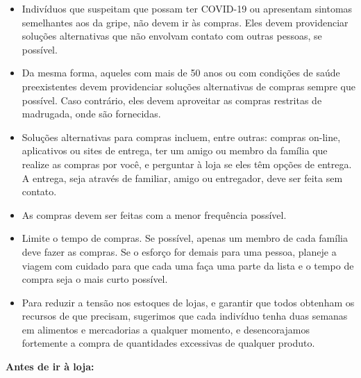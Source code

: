\documentclass[onecolumn,journal]{IEEEtran}
\begin{document}
\begin{multicols}{2}
\begin{itemize}
    \item Indivíduos que suspeitam que possam ter COVID-19 ou apresentam sintomas semelhantes aos da gripe, não devem ir às compras. Eles devem providenciar soluções alternativas que não envolvam contato com outras pessoas, se possível.
    \item Da mesma forma, aqueles com mais de 50 anos ou com condições de saúde preexistentes devem providenciar soluções alternativas de compras sempre que possível. Caso contrário, eles devem aproveitar as compras restritas de madrugada, onde são fornecidas.
    \item Soluções alternativas para compras incluem, entre outras: compras on-line, aplicativos ou sites de entrega, ter um amigo ou membro da família que realize as compras por você, e perguntar à loja se eles têm opções de entrega. A entrega, seja através de familiar, amigo ou entregador, deve ser feita sem contato.
    \item As compras devem ser feitas com a menor frequência possível.
    \item Limite o tempo de compras. Se possível, apenas um membro de cada família deve fazer as compras. Se o esforço for demais para uma pessoa, planeje a viagem com cuidado para que cada uma faça uma parte da lista e o tempo de compra seja o mais curto possível.
    \item Para reduzir a tensão nos estoques de lojas, e garantir que todos obtenham os recursos de que precisam, sugerimos que cada indivíduo tenha duas semanas em alimentos e mercadorias a qualquer momento, e desencorajamos fortemente a compra de quantidades excessivas de qualquer produto.
\end{itemize}

\vspace{2ex}

\textbf{Antes de ir à loja:}

\vspace{2ex}


\end{multicols}
\end{document}
